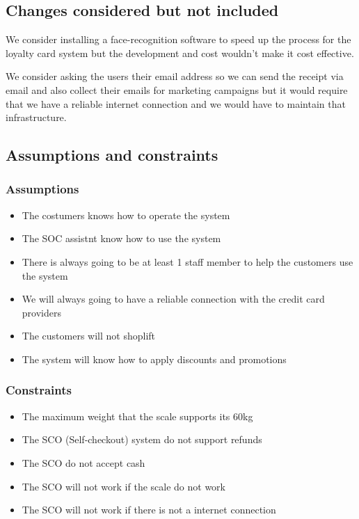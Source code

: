 \pagebreak
\subsection{Changes considered but not included}

We consider installing a face-recognition software to speed up the process 
for the loyalty card system but the development and cost wouldn’t make 
it cost effective.
\newline

\noindent
We consider asking the users their email address so we can send the receipt 
via email and also collect their emails for marketing campaigns but it would 
require that we have a reliable internet connection and we would have to 
maintain that infrastructure.
\newline

\subsection{Assumptions and constraints}
\subsubsection{Assumptions}
\begin{itemize}
    \item The costumers knows how to operate the system
    \item The SOC assistnt know how to use the system
    \item There is always going to be at least 1 staff member to help the 
    customers use the system
    \item We will always going to have a reliable connection with the credit 
    card providers
    \item The customers will not shoplift
    \item The system will know how to apply discounts and promotions
\end{itemize}

\subsubsection{Constraints}
\begin{itemize}
    \item The maximum weight that the scale supports its 60kg
    \item The SCO (Self-checkout) system do not support refunds
    \item The SCO do not accept cash
    \item The SCO will not work if the scale do not work
    \item The SCO will not work if there is not a internet connection
\end{itemize}